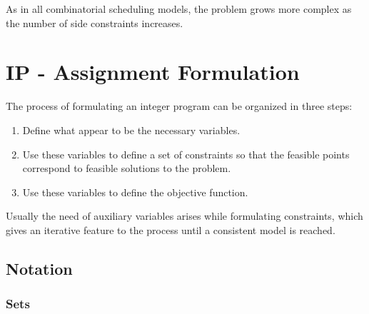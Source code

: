 As in all combinatorial scheduling models, the problem grows more complex as the number of side constraints increases.




\section{IP - Assignment Formulation}

The process of formulating an integer program can be organized in three steps:

\begin{enumerate}
\item Define what appear to be the necessary variables.
\item Use these variables to define a set of constraints so that the feasible points correspond to feasible solutions to the problem.
\item Use these variables to define the objective function.
\end{enumerate}

Usually the need of auxiliary variables arises while formulating constraints, which gives an iterative feature to the process until a consistent model is reached.



\subsection{Notation}

\subsubsection{Sets}

